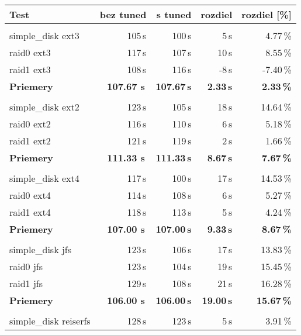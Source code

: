 {{{{\renewcommand{\arraystretch}{1.1}
\begin{table}[H]
\begin{center}
\begin{tabular}{|l|r r r r|}
    \hline
    \textbf{Test} & \textbf{bez tuned} & \textbf{s tuned} & \textbf{rozdiel} & \textbf{rozdiel [\%]} \\
    \hline & \\[-1em]\hline
    simple\_disk ext3 & 105\,s & 100\,s & 5\,s & 4.77\,\% \\
    raid0 ext3 & 117\,s & 107\,s & 10\,s & 8.55\,\% \\
    raid1 ext3 & 108\,s & 116\,s & -8\,s & -7.40\,\% \\
    \hline
    \textbf{Priemery} & \textbf{107.67 s}\,& \textbf{107.67\,s} & \textbf{2.33\,s} & \textbf{2.33\,\%} \\
    \hline & \\[-1em]\hline
    simple\_disk ext2 & 123\,s & 105\,s & 18\,s & 14.64\,\% \\
    raid0 ext2 & 116\,s & 110\,s & 6\,s & 5.18\,\% \\
    raid1 ext2 & 121\,s & 119\,s & 2\,s & 1.66\,\% \\
    \hline
    \textbf{Priemery} & \textbf{111.33 s}\,& \textbf{111.33\,s} & \textbf{8.67\,s} & \textbf{7.67\,\%} \\
    \hline & \\[-1em]\hline
    simple\_disk ext4 & 117\,s & 100\,s & 17\,s & 14.53\,\% \\
    raid0 ext4 & 114\,s & 108\,s & 6\,s & 5.27\,\% \\
    raid1 ext4 & 118\,s & 113\,s & 5\,s & 4.24\,\% \\
    \hline
    \textbf{Priemery} & \textbf{107.00 s}\,& \textbf{107.00\,s} & \textbf{9.33\,s} & \textbf{8.67\,\%} \\
    \hline & \\[-1em]\hline
    simple\_disk jfs & 123\,s & 106\,s & 17\,s & 13.83\,\% \\
    raid0 jfs & 123\,s & 104\,s & 19\,s & 15.45\,\% \\
    raid1 jfs & 129\,s & 108\,s & 21\,s & 16.28\,\% \\
    \hline
    \textbf{Priemery} & \textbf{106.00 s}\,& \textbf{106.00\,s} & \textbf{19.00\,s} & \textbf{15.67\,\%} \\
    \hline & \\[-1em]\hline
    simple\_disk reiserfs & 128\,s & 123\,s & 5\,s & 3.91\,\% \\

\end{tabular}
\end{center}
\end{table}}}}}
